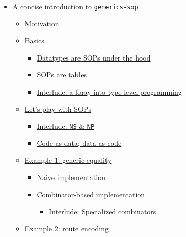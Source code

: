 \begin{itemize}
\tightlist
\item
  \protect\hyperlink{a-concise-introduction-to-generics-sop}{A concise
  introduction to \texttt{generics-sop}}

  \begin{itemize}
  \tightlist
  \item
    \protect\hyperlink{motivation}{Motivation}
  \item
    \protect\hyperlink{basics}{Basics}

    \begin{itemize}
    \tightlist
    \item
      \protect\hyperlink{datatypes-are-sops-under-the-hood}{Datatypes
      are SOPs under the hood}
    \item
      \protect\hyperlink{sops-are-tables}{SOPs are tables}
    \item
      \protect\hyperlink{interlude-a-foray-into-type-level-programming}{Interlude:
      a foray into type-level programming}
    \end{itemize}
  \item
    \protect\hyperlink{lets-play-with-sops}{Let's play with SOPs}

    \begin{itemize}
    \tightlist
    \item
      \protect\hyperlink{interlude-ns--np}{Interlude: \texttt{NS} \&
      \texttt{NP}}
    \item
      \protect\hyperlink{code-as-data-data-as-code}{Code as data; data
      as code}
    \end{itemize}
  \item
    \protect\hyperlink{example-1-generic-equality}{Example 1: generic
    equality}

    \begin{itemize}
    \tightlist
    \item
      \protect\hyperlink{naive-implementation}{Naive implementation}
    \item
      \protect\hyperlink{combinator-based-implementation}{Combinator-based
      implementation}

      \begin{itemize}
      \tightlist
      \item
        \protect\hyperlink{interlude-specialized-combinators}{Interlude:
        Specialized combinators}
      \end{itemize}
    \end{itemize}
  \item
    \protect\hyperlink{example-2-route-encoding}{Example 2: route
    encoding}


\end{itemize}
\end{itemize}
